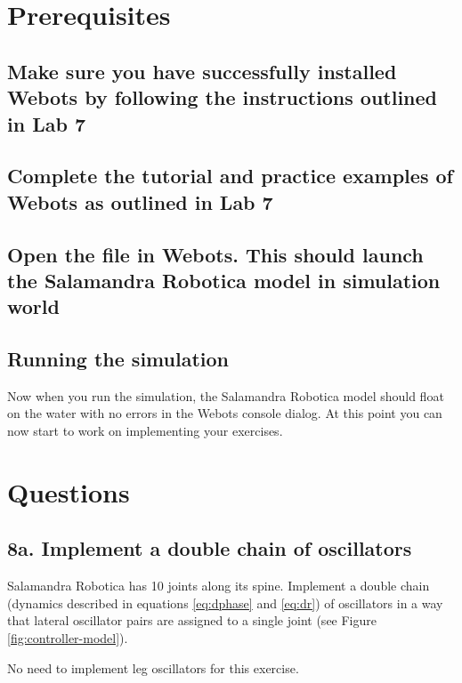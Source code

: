\documentclass{cmc}
\begin{document}

\section*{Prerequisites}

\subsection*{Make sure you have successfully installed Webots by
  following the instructions outlined in Lab 7}

\subsection*{Complete the tutorial and practice examples of Webots as
  outlined in Lab 7}

\subsection*{Open the  file
  in Webots. This should launch the Salamandra Robotica model in
  simulation world}

\subsection*{Running the simulation}
Now when you run the simulation, the Salamandra Robotica model should
float on the water with no errors in the Webots console dialog. At
this point you can now start to work on implementing your exercises.

\newpage

\section*{Questions}

\subsection*{8a. Implement a double chain of oscillators}
\label{sec:implement-chain}

Salamandra Robotica has 10 joints along its spine. Implement a double
chain (dynamics described in equations \ref{eq:dphase} and
\ref{eq:dr}) of oscillators in a way that lateral oscillator pairs are
assigned to a single joint (see Figure \ref{fig:controller-model}).

No need to implement leg oscillators for this
exercise.
\end{document}

